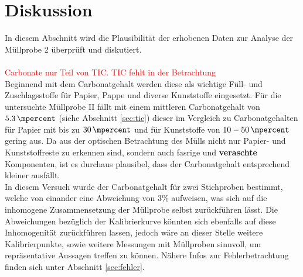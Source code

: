 \chapter{Diskussion}
\label{sec:diskussion}

In diesem Abschnitt wird die Plausibilität der erhobenen Daten zur Analyse der Müllprobe 2 überprüft und diskutiert.\\ \\
\textcolor{red}{Carbonate nur Teil von TIC. TIC fehlt in der Betrachtung}\\
Beginnend mit dem Carbonatgehalt werden diese als wichtige Füll- und Zuschlagsstoffe für Papier, Pappe und diverse Kunststoffe eingesetzt. Für die untersuchte Müllprobe II fällt mit einem mittleren Carbonatgehalt von $\SI{5,3}{\mpercent}$ (siehe Abschnitt \ref{sec:tic}) dieser im Vergleich zu Carbonatgehalten für Papier mit bis zu $\SI{30}{\mpercent}$ \cite{Wikipedia.21.11.2019} und für Kunststoffe von $10 - \SI{50}{\mpercent}$ \cite{PolymerServiceGmbHMerseburg.13.08.2019} gering aus. Da aus der optischen Betrachtung des Mülls nicht nur Papier- und Kunststoffreste zu erkennen sind, sondern auch fasrige und \textbf{ veraschte} Komponenten, ist es durchaus plausibel, dass der Carbonatgehalt entsprechend kleiner ausfällt. \\
In diesem Versuch wurde der Carbonatgehalt für zwei Stichproben bestimmt, welche von einander eine Abweichung von 3\% aufweisen, was sich auf die inhomogene Zusammensetzung der Müllprobe selbst zurückführen lässt.\linebreak
Die Abweichungen bezüglich der Kalibrierkurve könnten sich ebenfalls auf diese Inhomogenität zurückführen lassen, jedoch wäre an dieser Stelle weitere Kalibrierpunkte, sowie weitere Messungen mit Müllproben sinnvoll, um repräsentative Aussagen treffen zu können. Nähere Infos zur Fehlerbetrachtung finden sich unter Abschnitt \ref{sec:fehler}.\\

